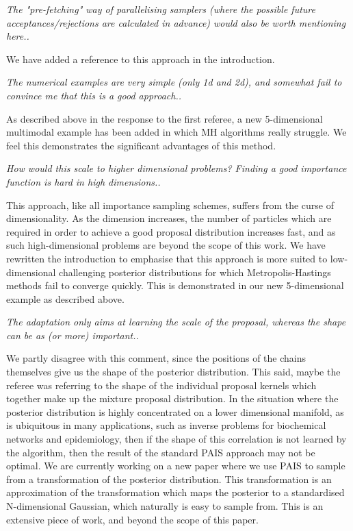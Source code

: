 \documentclass{article}
\newcommand{\comment}[2]{\vspace{0.6cm}{\bf Comment:} {\it #1.}

\vspace{0.3cm}{\bf Answer:} #2}
\begin{document}
\comment{The "pre-fetching" way of parallelising samplers (where the possible future acceptances/rejections are calculated in advance) would also be worth mentioning here.}{We have added a reference to this approach in the introduction.}

\comment{The numerical examples are very simple (only 1d and 2d), and somewhat fail to convince me that this is a good approach.}{As described above in the response to the first referee, a new 5-dimensional multimodal example has been added in which MH algorithms really struggle. We feel this demonstrates the significant advantages of this method.}

\comment{How would this scale to higher dimensional problems? Finding a good importance function is hard in high dimensions.}{This approach, like all importance sampling schemes, suffers from the curse of dimensionality. As the dimension increases, the number of particles which are required in order to achieve a good proposal distribution increases fast, and as such high-dimensional problems are beyond the scope of this work. We have rewritten the introduction to emphasise that this approach is more suited to low-dimensional challenging posterior distributions for which Metropolis-Hastings methods fail to converge quickly. This is demonstrated in our new 5-dimensional example as described above.}

\comment{The adaptation only aims at learning the scale of the proposal, whereas the shape can be as (or more) important.}{We partly disagree with this comment, since the positions of the chains themselves give us the shape of the posterior distribution. This said, maybe the referee was referring to the shape of the individual proposal kernels which together make up the mixture proposal distribution. In the situation where the posterior distribution is highly concentrated on a lower dimensional manifold, as is ubiquitous in many applications, such as inverse problems for biochemical networks and epidemiology, then if the shape of this correlation is not learned by the algorithm, then the result of the standard PAIS approach may not be optimal. We are currently working on a new paper where we use PAIS to sample from a transformation of the posterior distribution. This transformation is an approximation of the transformation which maps the posterior to a standardised N-dimensional Gaussian, which naturally is easy to sample from. This is an extensive piece of work, and beyond the scope of this paper.}
\end{document}
